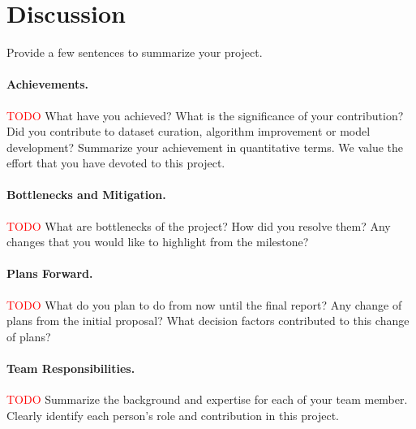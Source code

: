 \documentclass{article}
\begin{document}
\section{Discussion}
\label{sec:discussion}
Provide a few sentences to summarize your project. 

\paragraph{Achievements.}
\textcolor{red}{TODO} What have you achieved? What is the significance of your contribution? Did you contribute to dataset curation, algorithm improvement or model development?  Summarize your achievement in quantitative terms. We value the effort that you have devoted to this project.




\paragraph{Bottlenecks and Mitigation.}
\textcolor{red}{TODO} What are bottlenecks of the project? How did you resolve them?  Any changes that you would like to highlight from the milestone?



\paragraph{Plans Forward.}
\textcolor{red}{TODO} What do you plan to do from now until the final report? Any change of plans from the initial proposal? What decision factors contributed to this change of plans?



\paragraph{Team Responsibilities.}
\textcolor{red}{TODO} Summarize the background and expertise for each of your team member. Clearly identify each person's role and contribution in this project.
\end{document}
